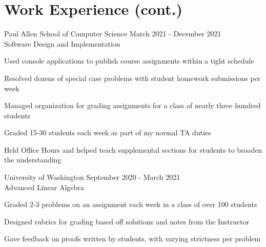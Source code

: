 \documentclass[10pt]{article}
\newenvironment{itemize*}
{\begin{itemize}[leftmargin=*]
    \setlength{\parskip}{0.5pt}}
{\end{itemize}}
\begin{document}
\section*{Work Experience (cont.)}
\begin{description}[leftmargin=!,
                    labelwidth=\widthof{\bfseries Teaching Assistant}]

\item[Teaching Assistant] Paul Allen School of Computer Science \hfill 
    March 2021 - December 2021\\
    Software Design and Implementation
\end{description}
\begin{itemize*}
\item Used console applications to publish course assignments within a tight schedule
\item Resolved dozens of special case problems with student homework submissions per week
\item Managed organization for grading assignments for a class of nearly three hundred students
\item Graded 15-30 students each week as part of my normal TA duties
\item Held Office Hours and helped teach supplemental sections for students to
    broaden the understanding
\end{itemize*}
\vspace{10pt}

\begin{description}[leftmargin=!,
                    labelwidth=\widthof{\bfseries Grader}]
\item[Grader] University of Washington \hfill
    September 2020 - March 2021\\
    Advanced Linear Algebra
\end{description}
\begin{itemize*}
\item Graded 2-3 problems on an assignment each week in a class of over 100 students
\item Designed rubrics for grading based off solutions and notes from the Instructor
\item Gave feedback on proofs written by students, with varying strictness per problem
\end{itemize*}
\vspace{10pt}
\end{document}

